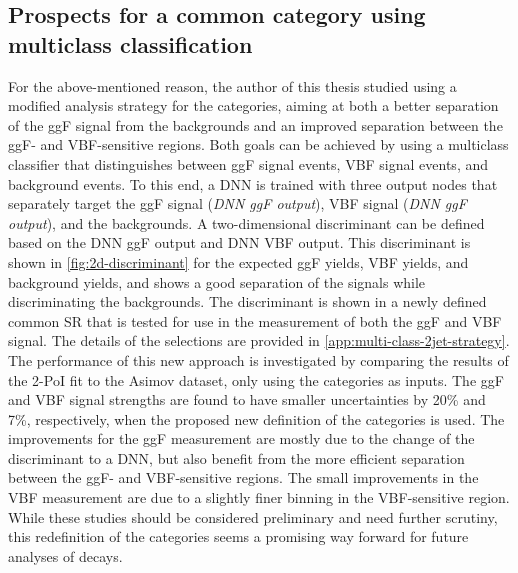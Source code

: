 \subsection{Prospects for a common \TwoJet category using multiclass classification}
For the above-mentioned reason, the author of this thesis studied using a modified analysis strategy for the \TwoJet categories, aiming at both a better separation of the ggF signal from the backgrounds and an improved separation between the ggF- and VBF-sensitive regions. 
Both goals can be achieved by using a multiclass classifier that distinguishes between ggF signal events, VBF signal events, and background events. 
To this end, a DNN is trained with three output nodes that separately target the ggF signal (\emph{DNN ggF output}), VBF signal (\emph{DNN ggF output}), and the backgrounds. 
A two-dimensional discriminant can be defined based on the DNN ggF output and DNN VBF output.
This discriminant is shown in \cref{fig:2d-discriminant} for the expected ggF yields, VBF yields, and background yields, and shows a good separation of the signals while discriminating the backgrounds. 
The discriminant is shown in a newly defined common \TwoJet SR that is tested for use in the measurement of both the ggF and VBF signal. 
The details of the selections are provided in \cref{app:multi-class-2jet-strategy}. 
The performance of this new approach is investigated by comparing the results of the 2-PoI fit to the Asimov dataset, only using the \TwoJet categories as inputs. 
The ggF and VBF signal strengths are found to have smaller uncertainties by 20\% and 7\%, respectively, when the proposed new definition of the \TwoJet categories is used. 
The improvements for the ggF measurement are mostly due to the change of the discriminant to a DNN, but also benefit from the more efficient separation between the ggF- and VBF-sensitive regions. 
The small improvements in the VBF measurement are due to a slightly finer binning in the VBF-sensitive region. 
While these studies should be considered preliminary and need further scrutiny, this redefinition of the \TwoJet categories seems a promising way forward for future analyses of \HWW decays.

